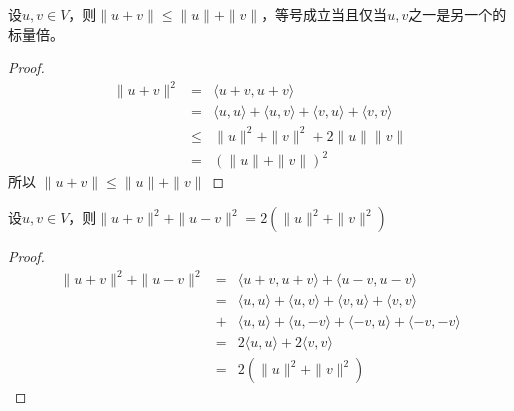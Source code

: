 \documentclass[10pt,a4paper,UTF8]{article}
\begin{document}
\begin{theorem}
设\(u,v\in V\)，则\(\| u + v \| \leq \| u \| +  \| v \|\)，等号成立当且仅当\(u,v\)之一是另一个的标量倍。
\end{theorem}
\begin{proof}
\begin{eqnarray}
\label{eq:14}
\| u+v \|^{2} &=& \langle u+v,u+v \rangle  \\
&=& \langle u,u \rangle  + \langle u,v \rangle  + \langle v,u \rangle  + \langle v,v \rangle  \\
&\leq& \| u \|^{2} + \| v \|^{2} + 2 \| u \| \| v \| \\
&=& ( \| u \| + \| v \| )^{2}
\end{eqnarray}
所以 \(\| u + v \| \leq \| u \| + \| v \|\)
\end{proof}

\begin{theorem}
设\(u,v\in V\)，则\(\| u + v \|^{2} + \| u-v \|^{2} = 2( \| u \|^{2} + \| v \|^{2})\)
\end{theorem}
\begin{proof}
\begin{eqnarray}
\label{eq:15}
\| u+v \|^{2} + \| u-v \|^{2} &=& \langle u + v,u+v \rangle   + \langle u-v,u-v \rangle  \\
&=& \langle u,u \rangle  + \langle u,v \rangle + \langle v,u \rangle + \langle v,v \rangle \\
&+& \langle u,u \rangle + \langle u,-v \rangle + \langle -v,u \rangle + \langle -v,-v \rangle \\
&=& 2 \langle u,u \rangle  + 2 \langle v,v \rangle \\
&=& 2( \| u \|^{2} + \| v \|^{2} )
\end{eqnarray}
\end{proof}
\end{document}
